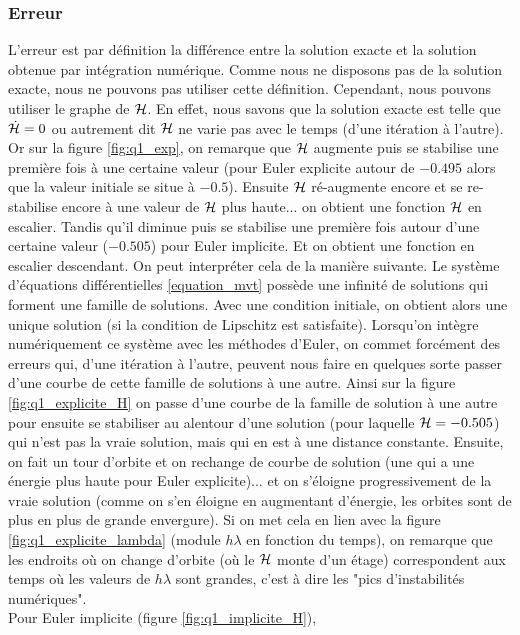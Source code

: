 \subsubsection{Erreur}
L'erreur est par définition la différence entre la solution exacte et la solution obtenue par intégration numérique.
Comme nous ne disposons pas de la solution exacte, nous ne pouvons pas utiliser cette définition. Cependant, nous pouvons utiliser le graphe de $\mathcal{H}$.
En effet, nous savons que la solution exacte est telle que $\dot{\mathcal{H}} = 0$ ou autrement dit $\mathcal{H}$ ne varie pas avec le temps (d'une itération à l'autre).
Or sur la figure \ref{fig:q1_exp}, on remarque que $\mathcal{H}$ augmente puis se stabilise une première fois à une certaine valeur (pour Euler explicite autour de $-0.495$ alors que la valeur initiale se situe à $-0.5$). Ensuite $\mathcal{H}$ ré-augmente encore et se re-stabilise encore à une valeur de $\mathcal{H}$ plus haute... on obtient une fonction $\mathcal{H}$ en escalier. Tandis qu'il diminue puis se stabilise une première fois autour d'une certaine valeur ($-0.505$) pour Euler implicite. Et on obtient une fonction en escalier descendant.
On peut interpréter cela de la manière suivante.
Le système d'équations différentielles \ref{equation_mvt} possède une infinité de solutions qui forment une famille de solutions.
Avec une condition initiale, on obtient alors une unique solution (si la condition de Lipschitz est satisfaite).
Lorsqu'on intègre numériquement ce système avec les méthodes d'Euler,
on commet forcément des erreurs qui, d'une itération à l'autre, peuvent
nous faire en quelques sorte passer d'une courbe de cette famille de solutions à une autre.
Ainsi sur la figure \ref{fig:q1_explicite_H} on passe d'une courbe de la famille de solution à une autre pour ensuite se stabiliser au alentour d'une solution (pour laquelle $\mathcal{H}=-0.505$) qui n'est pas la vraie solution,
mais qui en est à une distance constante. Ensuite, on fait un tour d'orbite et on rechange de courbe de solution (une qui a une énergie plus haute pour Euler explicite)... et on s'éloigne progressivement de la vraie solution (comme on s'en éloigne en augmentant d'énergie, les orbites sont de plus en plus de grande envergure). Si on met cela en lien avec la figure \ref{fig:q1_explicite_lambda} (module $h\lambda$ en fonction du temps), on remarque que les endroits où on change d'orbite (où le $\mathcal{H}$ monte d'un étage) correspondent aux temps où les valeurs de $h \lambda $ sont grandes, c'est à dire les "pics d'instabilités numériques". \\
Pour Euler implicite (figure \ref{fig:q1_implicite_H}),
